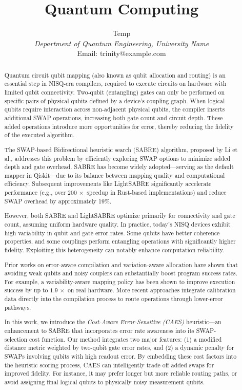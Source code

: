 \documentclass[conference]{IEEEtran}
\title{Quantum Computing}
\author{
    Temp\\
    \textit{Department of Quantum Engineering, University Name}\\
    Email: trinity@example.com
}
\begin{document}
\maketitle


\begin{abstract}
Quantum circuit qubit mapping (also known as qubit allocation and routing) is an essential step in NISQ-era compilers, required to execute circuits on hardware with limited qubit connectivity. Two-qubit (entangling) gates can only be performed on specific pairs of physical qubits defined by a device’s coupling graph. When logical qubits require interaction across non-adjacent physical qubits, the compiler inserts additional SWAP operations, increasing both gate count and circuit depth. These added operations introduce more opportunities for error, thereby reducing the fidelity of the executed algorithm.

The SWAP-based Bidirectional heuristic search (SABRE) algorithm, proposed by Li et al., addresses this problem by efficiently exploring SWAP options to minimize added depth and gate overhead. SABRE has become widely adopted—serving as the default mapper in Qiskit—due to its balance between mapping quality and computational efficiency. Subsequent improvements like LightSABRE significantly accelerate performance (e.g., over $200\,\times$ speedup in Rust-based implementations) and reduce SWAP overhead by approximately 19\%.

However, both SABRE and LightSABRE optimize primarily for connectivity and gate count, assuming uniform hardware quality. In practice, today's NISQ devices exhibit high variability in qubit and gate error rates. Some qubits have better coherence properties, and some couplings perform entangling operations with significantly higher fidelity. Exploiting this heterogeneity can notably enhance computation reliability.

Prior works on error-aware compilation and variation-aware allocation have shown that avoiding weak qubits and noisy couplers can substantially boost program success rates. For example, a variability-aware mapping policy has been shown to improve execution success by up to $1.9\,\times$ on real hardware. More recent approaches integrate calibration data directly into the compilation process to route operations through lower-error pathways.

In this work, we introduce the \emph{Cost-Aware Error-Sensitive (CAES)} heuristic—an enhancement to SABRE that incorporates error rate awareness into its SWAP-selection cost function. Our method integrates two major features: (1) a modified distance metric weighted by two-qubit gate error rates, and (2) a dynamic penalty for SWAPs involving qubits with high readout error. By embedding these cost factors into the heuristic scoring process, CAES can intelligently trade off added swaps for improved fidelity. For instance, it may prefer longer but more reliable routing paths, or avoid assigning final logical qubits to physically noisy measurement qubits.


\end{abstract}
\end{document}
